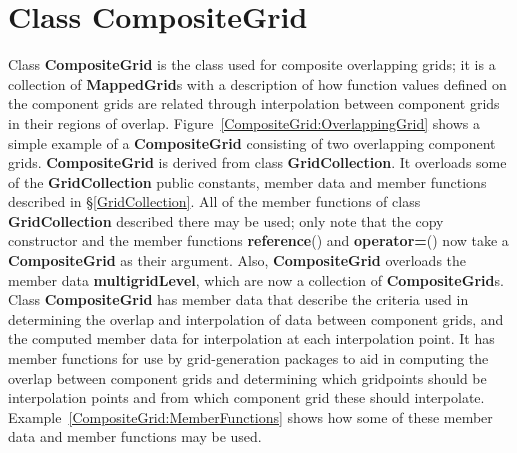 \documentclass{article}
\newcommand{\Index}[1]{#1\index{#1}}
\begin{document}
\section{Class \textbf{\Index{CompositeGrid}}}
\label{CompositeGrid}

Class \textbf{CompositeGrid} is the class used for composite overlapping grids; it is a collection of \textbf{MappedGrid}s
with a description of how function values defined on the component grids are related through interpolation between component grids in their
regions of overlap.  Figure~\ref{CompositeGrid:OverlappingGrid} shows a simple example of a \textbf{CompositeGrid} consisting of two
overlapping component grids.  \textbf{CompositeGrid} is derived from class \textbf{GridCollection}.  It overloads some of the
\textbf{GridCollection} public constants, member data and member functions described in \S\ref{GridCollection}.  All of the member
functions of class \textbf{GridCollection} described there may be used; only note that the copy constructor and the member functions
\textbf{reference}() and \textbf{operator=}() now take a \textbf{CompositeGrid} as their argument.  Also,
\textbf{CompositeGrid} overloads the member data \textbf{multigridLevel}, which are now a collection of
\textbf{CompositeGrid}s.  Class \textbf{CompositeGrid} has member data that describe the criteria used in determining the
overlap and interpolation of data between component grids, and the computed member data for interpolation at each interpolation point.
It has member functions for use by grid-generation packages to aid in computing the overlap between component grids and determining which
gridpoints should be interpolation points and from which component grid these should interpolate.  Example~\ref{CompositeGrid:MemberFunctions}
shows how some of these member data and member functions may be used.


\end{document}
